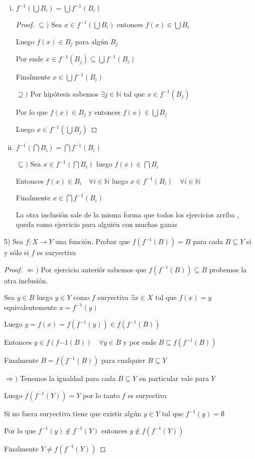 \documentclass[12pt]{article}
\newcommand{\N}{\mathbb{N}}
\newcommand{\Ra}{\Rightarrow}
\newcommand{\ra}{\rightarrow}
\theoremstyle{definition}
\begin{document}
\begin{enumerate}[i.]
  \item $f^{-1}(\bigcup B_{i}) = \bigcup f^{-1}(B_{i})$
    \begin{proof}
      $\subseteq )$ Sea $x \in f^{-1}(\bigcup B_{i})$ entonces $f(x) \in \bigcup B_{i}$

      Luego $f(x) \in B_{j}$ para algún $B_{j}$

      Por ende $x \in f^{-1}(B_{j}) \subseteq \bigcup f^{-1}(B_{i})$

      Finalmente $x \in \bigcup f^{-1}(B_{i})$

      $\supseteq )$ Por hipótesis sabemos $\exists j \in \N$ tal que $x \in f^{-1}(B_{j})$

      Por lo que $f(x) \in B_{j}$ y entonces $f(x) \in \bigcup B_{j}$

      Luego $x \in f^{-1} (\bigcup B_{j})$
    \end{proof}
  \item $f^{-1}(\bigcap B_{i}) = \bigcap f^{-1}(B_{i})$

    $\subseteq )$ Sea $x \in f^{-1}(\bigcap B_{i})$ luego $f(x) \in \bigcap B_{i}$

    Entonces $f(x) \in B_{i} \quad \forall i \in \N$ luego $x \in f^{-1}(B_{i}) \quad \forall i \in \N$

    Finalmente $x \in \bigcap f^{-1}(B_{i})$

    La otra inclusión sale de la misma forma que todos los ejercicios arriba , queda como ejercicio para alguién con muchas ganas

\end{enumerate}

5) Sea $f: X \ra Y$ una función. Probar que $f(f^{-1}(B)) = B$ para cada $B \subseteq Y$ si y sólo si $f$ es suryectiva

\begin{proof}
 $\Leftarrow)$ Por ejercicio anteriór sabemos que $f(f^{-1}(B)) \subseteq B $ probemos la otra inclusión.

  Sea $y \in B$ luego $y \in Y$ como $f$ suryectiva $\exists x \in X$ tal que $f(x) = y$ equivalentemente $x = f^{-1}(y)$

  Luego $y = f(x) = f(f^{-1}(y)) \in f(f^{-1}(B)) $

  Entonces $y \in f(f{-1}(B)) \quad \forall y \in B $ y por ende $B \subseteq f(f^{-1}(B))$ 

  Finalmente $B = f(f^{-1}(B)) $ para cualquier $B \subseteq Y$

  $\Ra )$ Tenemos la igualdad para cada $B \subseteq Y$ en particular vale para $Y$ 

  Luego $f(f^{-1}(Y)) = Y$ por lo tanto $f$ es suryectiva 

  Si no fuera suryectiva tiene que existir algún $y \in Y$ tal que $f^{-1}(y) = \emptyset$ 

  Por lo que $f^{-1}(y) \notin f^{-1}(Y)$ entonces $y \notin f(f^{-1}(Y))$

  Finalmente $Y \neq f(f^{-1}(Y))$
\end{proof}
\end{document}
